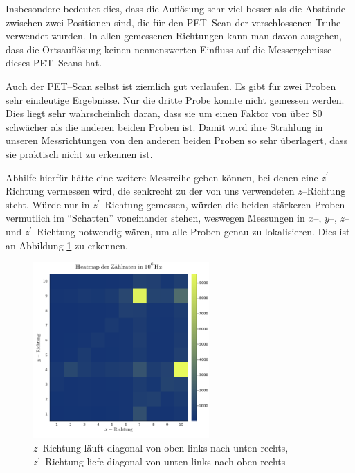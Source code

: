 \documentclass[12pt,a4paper]{scrartcl}
\numberwithin{equation}{section} %
\begin{document}
Insbesondere bedeutet dies, dass die Auflösung sehr viel besser als die Abstände zwischen zwei Positionen sind, die für den PET--Scan der verschlossenen Truhe verwendet wurden. In allen gemessenen Richtungen kann man davon ausgehen, dass die Ortsauflösung keinen nennenswerten Einfluss auf die Messergebnisse dieses PET--Scans hat.

Auch der PET--Scan selbst ist ziemlich gut verlaufen. Es gibt für zwei Proben sehr eindeutige Ergebnisse. Nur die dritte Probe konnte nicht gemessen werden. Dies liegt sehr wahrscheinlich daran, dass sie um einen Faktor von über $80$ schwächer als die anderen beiden Proben ist. Damit wird ihre Strahlung in unseren Messrichtungen von den anderen beiden Proben so sehr überlagert, dass sie praktisch nicht zu erkennen ist.

Abhilfe hierfür hätte eine weitere Messreihe geben können, bei denen eine $z^\prime$--Richtung vermessen wird, die senkrecht zu der von uns verwendeten $z$--Richtung steht. Würde nur in $z^\prime$--Richtung gemessen, würden die beiden stärkeren Proben vermutlich im ``Schatten'' voneinander stehen, weswegen Messungen in $x$--, $y$--, $z$-- und $z^\prime$--Richtung notwendig wären, um alle Proben genau zu lokalisieren. Dies ist an Abbildung \ref{abb:heatmap} zu erkennen.

\begin{figure}[h]
	\centering
	\vspace{24pt}
	\includegraphics[width=0.6\textwidth]{../media/B3.4/heatmap.png}
	\caption{$z$--Richtung läuft diagonal von oben links nach unten rechts, \\
		$z^\prime$--Richtung liefe diagonal von unten links nach oben rechts}
	\label{abb:heatmap}
\end{figure}
\end{document}
